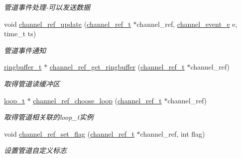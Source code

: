 \begin{DoxyCompactItemize}
\begin{DoxyCompactList}\small\item\em 管道事件处理-\/可以发送数据 \end{DoxyCompactList}\item 
void \hyperlink{a00041_aac9295d2423894326c8b62e0ee851f89_aac9295d2423894326c8b62e0ee851f89}{channel\+\_\+ref\+\_\+update} (\hyperlink{a00044_a151271c9d188ef28d4d24bb81dcc1263_a151271c9d188ef28d4d24bb81dcc1263}{channel\+\_\+ref\+\_\+t} $\ast$channel\+\_\+ref, \hyperlink{a00044_a5ad43ab162fdf9ad53cde10ed3d87d99_a5ad43ab162fdf9ad53cde10ed3d87d99}{channel\+\_\+event\+\_\+e} e, time\+\_\+t ts)
\begin{DoxyCompactList}\small\item\em 管道事件通知 \end{DoxyCompactList}\item 
\hyperlink{a00044_af929c5cf86b6a0f64dde407dfe60482e_af929c5cf86b6a0f64dde407dfe60482e}{ringbuffer\+\_\+t} $\ast$ \hyperlink{a00041_a7f81588a2beaa8c33a5eb7bf2236e566_a7f81588a2beaa8c33a5eb7bf2236e566}{channel\+\_\+ref\+\_\+get\+\_\+ringbuffer} (\hyperlink{a00044_a151271c9d188ef28d4d24bb81dcc1263_a151271c9d188ef28d4d24bb81dcc1263}{channel\+\_\+ref\+\_\+t} $\ast$channel\+\_\+ref)
\begin{DoxyCompactList}\small\item\em 取得管道读缓冲区 \end{DoxyCompactList}\item 
\hyperlink{a00044_a9c3ad1cd2de83e09f3a7b59fa82c94ee_a9c3ad1cd2de83e09f3a7b59fa82c94ee}{loop\+\_\+t} $\ast$ \hyperlink{a00041_af3fce9f1faac3773f726b1b913d42787_af3fce9f1faac3773f726b1b913d42787}{channel\+\_\+ref\+\_\+choose\+\_\+loop} (\hyperlink{a00044_a151271c9d188ef28d4d24bb81dcc1263_a151271c9d188ef28d4d24bb81dcc1263}{channel\+\_\+ref\+\_\+t} $\ast$channel\+\_\+ref)
\begin{DoxyCompactList}\small\item\em 取得管道相关联的loop\+\_\+t实例 \end{DoxyCompactList}\item 
void \hyperlink{a00041_a754666526c935285bd6c9367513b5832_a754666526c935285bd6c9367513b5832}{channel\+\_\+ref\+\_\+set\+\_\+flag} (\hyperlink{a00044_a151271c9d188ef28d4d24bb81dcc1263_a151271c9d188ef28d4d24bb81dcc1263}{channel\+\_\+ref\+\_\+t} $\ast$channel\+\_\+ref, int flag)
\begin{DoxyCompactList}\small\item\em 设置管道自定义标志 \end{DoxyCompactList}\item 

\end{DoxyCompactItemize}
